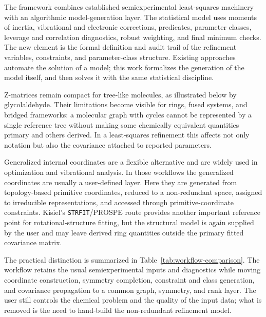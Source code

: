 \documentclass[aip,jcp,reprint,longbibliography,floatfix]{revtex4-2}
\begin{document}
The framework combines established semiexperimental least-squares
machinery\cite{Mendolicchio2017MSR,Bartell1975Predicate,Mendolicchio2025FastDvib}
with an algorithmic model-generation layer. The statistical model
uses moments of inertia, vibrational and electronic corrections, predicates,
parameter classes, leverage and correlation diagnostics, robust weighting, and
final minimum checks. The new element is the formal definition and audit
trail of the refinement variables, constraints, and parameter-class structure.
Existing approaches automate the solution of a model; this work formalizes
the generation of the model itself, and then solves it with the same
statistical discipline.

Z-matrices remain compact for tree-like molecules, as illustrated below by
glycolaldehyde. Their limitations become visible for rings, fused systems, and
bridged frameworks: a molecular graph with cycles cannot be represented by a
single reference tree without making some chemically equivalent quantities
primary and others derived. In a least-squares refinement this affects not
only notation but also the covariance attached to reported parameters.

Generalized internal coordinates are a flexible alternative and are widely
used in optimization and vibrational analysis.\cite{Wilson1955,PulayFogarasi1992,Peng1996Redundant,Baker1996Delocalized,BakkenHelgaker2002,Marenich2025GIC} In those workflows the generalized coordinates are usually a user-defined
layer. Here they are generated from topology-based primitive coordinates,
reduced to a non-redundant space, assigned to irreducible representations, and
accessed through primitive-coordinate constraints. Kisiel's
\texttt{STRFIT}/PROSPE route\cite{KisielPROSPE} provides another important
reference point for rotational-structure fitting, but the structural model is
again supplied by the user and may leave derived ring quantities outside the
primary fitted covariance matrix.\cite{Kanzow2025PCCP}

The practical distinction is summarized in Table~\ref{tab:workflow-comparison}.
The workflow retains the usual semiexperimental inputs and diagnostics while
moving coordinate construction, symmetry completion, constraint and class
generation, and covariance propagation to a common graph, symmetry, and rank
layer. The
user still controls the chemical problem and the quality of the input data;
what is removed is the need to hand-build the non-redundant refinement model.
\end{document}
